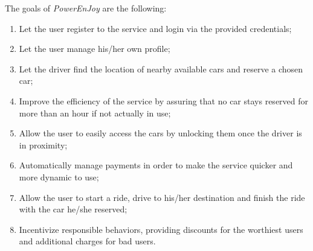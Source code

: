 The goals of \hbox{\emph{PowerEnJoy}} are the following:

\begin{enumerate}
\item Let the user register to the service and login via the provided credentials;
\item Let the user manage his/her own profile;
\item Let the driver find the location of nearby available cars and reserve a chosen car;
\item Improve the efficiency of the service by assuring that no car stays reserved for more than an hour if not actually in use;
\item Allow the user to easily access the cars by unlocking them once the driver is in proximity;
\item Automatically manage payments in order to make the service quicker and more dynamic to use; 
\item Allow the user to start a ride, drive to his/her destination and finish the ride with the car he/she reserved;
\item Incentivize responsible behaviors, providing discounts for the worthiest users and additional charges for bad users.
\end{enumerate}